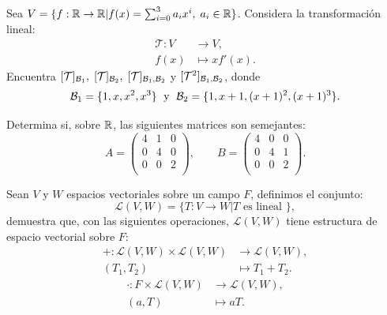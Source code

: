 \documentclass[12pt,a4paper]{book}
\newcommand{\llaves}[1]{\{#1\}}
\begin{document}
    \begin{ejercicio}
        Sea $V = \llaves{f: \R \to \R | f(x) = \sum_{i = 0}^{3}a_{i}x^{i},\; a_{i} \in \R}$. Considera la transformación lineal:
        \begin{align*}
            \mathcal{T}: V & \to V,\\
            f(x) & \mapsto xf'(x).
        \end{align*}
        Encuentra $[\mathcal{T}]_{\mathcal{B}_{1}}, \; [\mathcal{T}]_{\mathcal{B}_{2}}, \; [\mathcal{T}]_{\mathcal{B}_{1}, \mathcal{B}_{2}}$ y $[\mathcal{T}^{2}]_{\mathcal{B}_{1}, \mathcal{B}_{2}}$, donde
        \begin{equation*}
        \BB_{1} = \llaves{1, x, x^{2}, x^{3}} \; \text{ y } \; \BB_{2} = \llaves{1, x + 1, (x + 1)^{2}, (x + 1)^{3}}.
        \end{equation*}
    \end{ejercicio}

    \begin{ejercicio}
        Determina si, sobre $\mathbb{R}$, las siguientes matrices son semejantes:
        \begin{equation*}
        A = 
        \begin{pmatrix}
            4 & 1 & 0\\
            0 & 4 & 0\\
            0 & 0 & 2\\
        \end{pmatrix},
        \qquad
        B =
        \begin{pmatrix}
            4 & 0 & 0\\
            0 & 4 & 1\\
            0 & 0 & 2\\
        \end{pmatrix}.
        \end{equation*}
    \end{ejercicio}

    \begin{ejercicio}
        Sean $V$ y $W$ espacios vectoriales sobre un campo $F$, definimos el conjunto:
        \begin{equation*}
        \mathcal{L}(V, W) = \llaves{T: V \to W | T \text{ es lineal }},
        \end{equation*}
        demuestra que, con las siguientes operaciones, $\mathcal{L}(V, W)$ tiene estructura de espacio vectorial sobre $F$:
        \begin{align*}
            + : \mathcal{L}(V, W) \times \mathcal{L}(V, W) & \to \mathcal{L}(V, W),\\
            (T_{1}, T_{2}) & \mapsto T_{1} + T_{2}.
        \end{align*}
        \begin{align*}
            \cdot: F \times \mathcal{L}(V, W) & \to \mathcal{L}(V, W),\\
            (a, T) & \mapsto aT.
        \end{align*}
    \end{ejercicio} 
\end{document}
